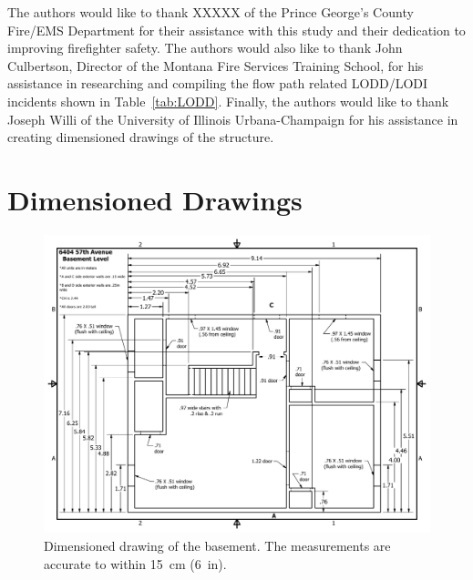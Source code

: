 \documentclass[12pt,oneside]{book}
\begin{document}
The authors would like to thank XXXXX of the Prince George's County Fire/EMS Department for their assistance with this study and their dedication to improving firefighter safety. The authors would also like to thank John Culbertson, Director of the Montana Fire Services Training School, for his assistance in researching and compiling the flow path related LODD/LODI incidents shown in Table~\ref{tab:LODD}. Finally, the authors would like to thank Joseph Willi of the University of Illinois Urbana-Champaign for his assistance in creating dimensioned drawings of the structure.




\appendix

\chapter{Dimensioned Drawings}
\label{app_draw}

\begin{figure}[!ht]
\centering
\includegraphics[width=1\textwidth]{../Figures/Basement_Metric}
\caption[Dimensioned drawing of first floor.]{Dimensioned drawing of the basement. The measurements are accurate to within 15~cm (6~in).}
\label{fig:basement}
\end{figure}
\end{document}
